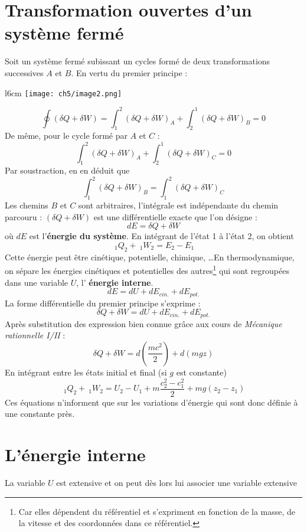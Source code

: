\section{Transformation ouvertes d'un système fermé}
Soit un système fermé subissant un cycles formé de deux transformations 
successives $A$ et $B$. En vertu du premier principe :\\
	\begin{wrapfigure}[9]{l}{6cm}
	\vspace{-7mm}
	\texttt{[image: ch5/image2.png]}
	\end{wrapfigure}
	\vspace{-1cm}
\begin{equation}
\oint (\delta Q + \delta W) = \int_1^2 (\delta Q + \delta W)_A + \int_2^1 
(\delta Q + \delta W)_B = 0
\end{equation}
De même, pour le cycle formé par $A$ et $C$ :
\begin{equation}
\int_1^2 (\delta Q + \delta W)_A + \int_2^1 (\delta Q + \delta W)_C = 0
\end{equation}
Par soustraction, en en déduit que
\begin{equation}
\int_1^2 (\delta Q + \delta W)_B = \int_1^2 (\delta Q + \delta W)_C
\end{equation}
Les chemins $B$ et $C$ sont arbitraires, l'intégrale est indépendante 
du chemin parcouru : $(\delta Q + \delta W)$ est une différentielle 
exacte que l'on désigne :
\begin{equation}
dE = \delta Q + \delta W
\end{equation}
où $dE$ est l'\textbf{énergie du système}. En intégrant de l'état 1 à 
l'état 2, on obtient
\begin{equation}
\ _1Q_2 + \ _1W_2 = E_2-E_1
\end{equation}
Cette énergie peut être cinétique, potentielle, chimique, \dots En 
thermodynamique, on sépare les énergies cinétiques et potentielles 
des autres\footnote{Car elles dépendent du référentiel et s'expriment 
en fonction de la masse, de la vitesse et des coordonnées dans ce 
référentiel.} qui sont regroupées dans une variable $U$, l'\textbf{
énergie interne}.
\begin{equation}
dE = dU + dE_{cin.} + dE_{pot.}
\end{equation}
La forme différentielle du premier principe s'exprime :
\begin{equation}
\delta Q + \delta W = dU + dE_{cin.} + dE_{pot.}
\end{equation}
Après substitution des expression bien connue grâce aux cours de \textit{
Mécanique rationnelle I/II} : 
\begin{equation}
\delta Q + \delta W = d\left(\frac{mc^2}{2}\right) + d(mgz)
\end{equation}
En intégrant entre les états initial et final (si $g$ est constante)
\begin{equation}
\ _1Q_2 + \ _1W_2 = U_2 - U_1 + m\frac{c_2^2-c_1^2}{2}+mg(z_2-z_1)
\end{equation}
Ces équations n'informent que sur les variations d'énergie qui sont 
donc définie à une constante près.

\section{L'énergie interne}
La variable $U$ est extensive et on peut dès lors lui associer une 
variable extensive